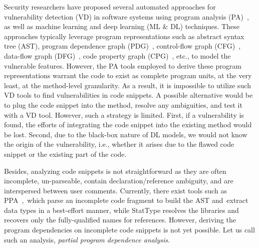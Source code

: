 Security researchers have proposed several automated approaches for vulnerability detection (VD) in software systems using program analysis (PA)~\cite{FlawFinder,RATS,viega2000its4,Checkmarx,HPFortify,Coverity}, as well as machine learning and deep learning (ML \& DL) \cite{fse21,chakraborty2020deep,zhou2019devign,li2018sysevr,li2018vuldeepecker} techniques. These approaches typically leverage program representations such as abstract syntax tree (AST), program dependence graph (PDG)~\cite{fse21,li2018vuldeepecker}, control-flow graph (CFG)~\cite{zhou2019devign}, data-flow graph (DFG)~\cite{zhou2019devign}, code property graph (CPG)~\cite{chakraborty2020deep}, etc., to model the vulnerable features. 
However, the PA tools employed to derive these program representations warrant the code to exist as complete program units, at the very least, at the method-level granularity. As a result, it is impossible to utilize such VD tools to find vulnerabilities in code snippets. A possible alternative would be to plug the code snippet into the method, resolve any ambiguities, and test it with a VD tool. However, such a strategy is limited. First, if a vulnerability is found, the efforts of integrating the code snippet into the existing method would be lost. Second, due to the black-box nature of DL models, we would not know the origin of the vulnerability, i.e., whether it arises due to the flawed code snippet or the existing part of the code.

Besides, analyzing code snippets is not straightforward as they are often incomplete, un-parseable, contain declaration/reference ambiguity, and are interspersed between user comments. Currently, there exist tools such as PPA~\cite{ppa08},~which parse an incomplete code fragment to build the AST and~ex\-tract data types in a best-effort manner, while StatType \cite{icse18} resolves the libraries and recovers only the fully-qualified names for references. However, deriving the program dependencies on incomplete code snippets is not yet possible. Let us call such an analysis, {\em partial program dependence analysis}.

